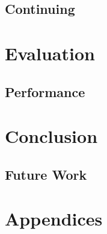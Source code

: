 \documentclass{UoYCSproject}
\begin{document}

\section{Continuing} %



\chapter{Evaluation}


\section{Performance}



\chapter{Conclusion}
\section{Future Work}




\chapter{Appendices}
\end{document}
